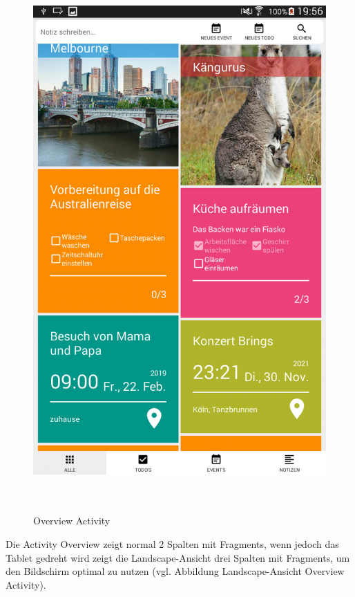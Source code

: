 \begin{figure}[H]
\centering
\begin{minipage}[t]{1\textwidth} %
\caption{Overview Activity} %
\includegraphics[height=20cm]{img/Overview}\\ %
\end{minipage}
\end{figure}

Die Activity Overview zeigt normal 2 Spalten mit Fragments, wenn jedoch das Tablet gedreht wird zeigt die Landscape-Ansicht drei Spalten mit Fragments, um den Bildschirm optimal zu nutzen (vgl. Abbildung Landscape-Ansicht Overview Activity).

